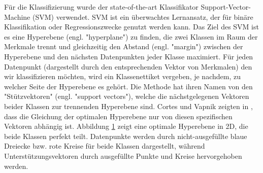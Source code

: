 F{\"u}r die Klassifizierung wurde der state-of-the-art Klassifikator Support-Vector-Machine (SVM) verwendet.
SVM ist ein {\"u}berwachtes Lernansatz, der f{\"u}r bin{\"a}re Klassifikation oder Regressionszwecke genutzt werden kann. 
Das Ziel des SVM ist es eine Hyperebene (engl. "hyperplane") zu finden, die zwei Klassen im Raum der Merkmale trennt und gleichzeitig den Abstand (engl. "margin") zwischen der Hyperebene und den n{\"a}chsten Datenpunkten jeder Klasse maximiert.
F{\"u}r jeden Datenpunkt (dargestellt durch den entsprechenden Vektor von Merkmalen) den wir klassifizieren m{\"o}chten, wird ein Klassenettiket vergeben, je nachdem, zu welcher Seite der Hyperebene es geh{\"o}rt.
Die Methode hat ihren Namen von den "St{\"u}tzvektoren" (engl. "support vectors"), welche die n{\"a}chstgelegenen Vektoren beider Klassen zur trennenden Hyperebene sind. 
Cortes und Vapnik zeigten in \cite{svn1995}, dass die Gleichung der optimalen Hyperebene nur von diesen spezifischen Vektoren abh{\"a}ngig ist.
Abbildung \ref{fig:svm} zeigt eine optimale Hyperebene in 2D, die beide Klassen perfekt teilt.
Datenpunkte werden durch nicht-ausgef{\"u}llte blaue Dreiecke bzw. rote Kreise f{\"u}r beide Klassen dargestellt, w{\"a}hrend Unterst{\"u}tzungsvektoren durch ausgef{\"u}llte Punkte und Kreise hervorgehoben werden. \\

\begin{figure}[h] 
\label{fig:svm} 
\end{figure} %

